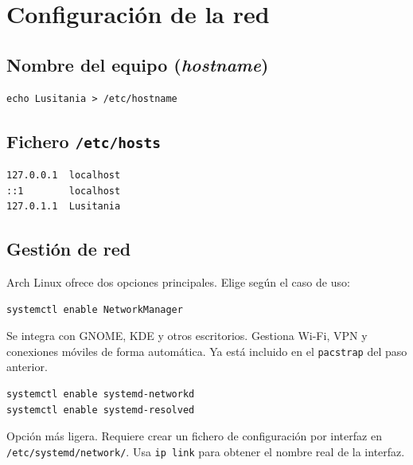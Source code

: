 \section{Configuración de la red}
\subsection{Nombre del equipo (\textit{hostname})}
\begin{tcolorbox}[title=Le damos nombre a nuestro ordenador]
\begin{lstlisting}[style=bashstyle]
echo Lusitania > /etc/hostname
\end{lstlisting}
\end{tcolorbox}

\subsection{Fichero \texttt{/etc/hosts}}

\begin{tcolorbox}[title=Añadimos las siguientes líneas en {\ttfamily /etc/hosts}]
\begin{lstlisting}[style=bashstyle]
127.0.0.1  localhost
::1        localhost
127.0.1.1  Lusitania
\end{lstlisting}
\end{tcolorbox}

\subsection{Gestión de red}

Arch Linux ofrece dos opciones principales. Elige según el caso de uso:

\begin{tcolorbox}[title={\faDesktop\hspace*{0.5em} NetworkManager} — recomendado para escritorio]
\begin{lstlisting}[style=bashstyle]
systemctl enable NetworkManager
\end{lstlisting}
\tcblower
\scriptsize Se integra con GNOME, KDE y otros escritorios. Gestiona Wi-Fi, VPN y conexiones móviles de forma automática.
Ya está incluido en el \texttt{pacstrap} del paso anterior.
\end{tcolorbox}

\begin{tcolorbox}[title={\faServer\hspace*{0.5em} systemd-networkd} — recomendado para servidor o instalación mínima]
\begin{lstlisting}[style=bashstyle]
systemctl enable systemd-networkd
systemctl enable systemd-resolved
\end{lstlisting}
\tcblower
\scriptsize Opción más ligera. Requiere crear un fichero de configuración por interfaz en \texttt{/etc/systemd/network/}.
Usa \texttt{ip link} para obtener el nombre real de la interfaz.
\end{tcolorbox}
\newpage
